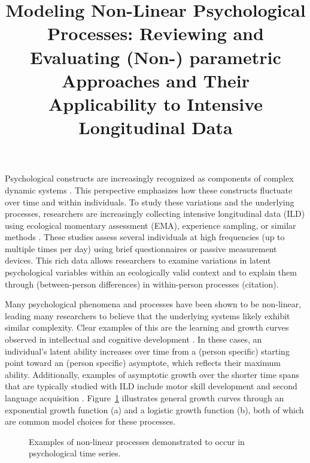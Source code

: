 \documentclass[man, floatsintext]{apa7}
\title{Modeling Non-Linear Psychological Processes: Reviewing and Evaluating
  (Non-) parametric Approaches and Their Applicability to Intensive
  Longitudinal
  Data}
\begin{document}
\maketitle

Psychological constructs are increasingly recognized as components of complex
dynamic systems \parencite{nesselroade_studying_2004, wang_investigating_2012}.
This perspective emphasizes how these constructs fluctuate over time and within
individuals. To study these variations and the underlying processes,
researchers are increasingly collecting intensive longitudinal data (ILD) using
ecological momentary assessment (EMA), experience sampling, or similar methods
\parencite{fritz_so_2023}. These studies assess several individuals at high
frequencies (up to multiple times per day) using brief questionnaires or
passive measurement devices. This rich data allows researchers to examine
variations in latent psychological variables within an ecologically valid
context and to explain them through (between-person differences)
in within-person processes (citation).

Many psychological phenomena and processes have been shown to be non-linear,
leading many researchers to believe that the underlying systems likely exhibit
similar complexity. Clear examples of this are the learning and growth curves
observed in intellectual and cognitive development
\parencite{kunnen_dynamic_2012, mcardle_comparative_2002}. In these cases, an
individual's latent ability increases over time from a (person specific)
starting point toward an (person specific) asymptote,
which reflects their maximum ability. Additionally, examples of
asymptotic growth over the shorter time spans that are typically studied with
ILD include
motor skill development \parencite{newell_time_2001} and second language
acquisition \parencite{de_bot_dynamic_2007}. Figure~\ref{fig:examplar_npn}
illustrates general growth curves through an exponential growth function (a)
and a logistic growth function (b), both of which are common model choices for
these processes.

\begin{figure}[!ht]
  \caption{Examples of non-linear processes demonstrated to occur in
    psychological time series.}
  \label{fig:examplar_npn}
\end{figure}
\end{document}
